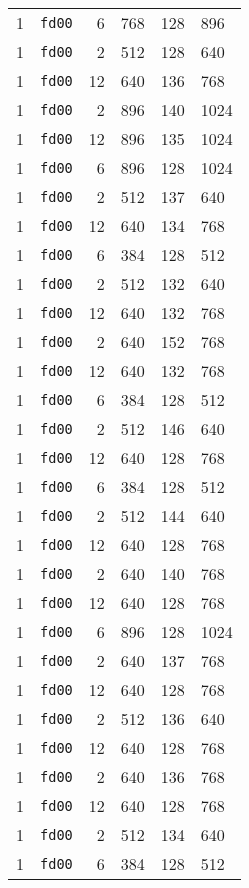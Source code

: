 \documentclass{article}
\begin{document}
\begin{table}[h!]
\begin{tabular}{llrrrl}
    1 & \texttt{fd00} & 6 & 768 & 128 & 896 \\
    1 & \texttt{fd00} & 2 & 512 & 128 & 640 \\
    1 & \texttt{fd00} & 12 & 640 & 136 & 768 \\
    1 & \texttt{fd00} & 2 & 896 & 140 & 1024 \\
    1 & \texttt{fd00} & 12 & 896 & 135 & 1024 \\
    1 & \texttt{fd00} & 6 & 896 & 128 & 1024 \\
    1 & \texttt{fd00} & 2 & 512 & 137 & 640 \\
    1 & \texttt{fd00} & 12 & 640 & 134 & 768 \\
    1 & \texttt{fd00} & 6 & 384 & 128 & 512 \\
    1 & \texttt{fd00} & 2 & 512 & 132 & 640 \\
    1 & \texttt{fd00} & 12 & 640 & 132 & 768 \\
    1 & \texttt{fd00} & 2 & 640 & 152 & 768 \\
    1 & \texttt{fd00} & 12 & 640 & 132 & 768 \\
    1 & \texttt{fd00} & 6 & 384 & 128 & 512 \\
    1 & \texttt{fd00} & 2 & 512 & 146 & 640 \\
    1 & \texttt{fd00} & 12 & 640 & 128 & 768 \\
    1 & \texttt{fd00} & 6 & 384 & 128 & 512 \\
    1 & \texttt{fd00} & 2 & 512 & 144 & 640 \\
    1 & \texttt{fd00} & 12 & 640 & 128 & 768 \\
    1 & \texttt{fd00} & 2 & 640 & 140 & 768 \\
    1 & \texttt{fd00} & 12 & 640 & 128 & 768 \\
    1 & \texttt{fd00} & 6 & 896 & 128 & 1024 \\
    1 & \texttt{fd00} & 2 & 640 & 137 & 768 \\
    1 & \texttt{fd00} & 12 & 640 & 128 & 768 \\
    1 & \texttt{fd00} & 2 & 512 & 136 & 640 \\
    1 & \texttt{fd00} & 12 & 640 & 128 & 768 \\
    1 & \texttt{fd00} & 2 & 640 & 136 & 768 \\
    1 & \texttt{fd00} & 12 & 640 & 128 & 768 \\
    1 & \texttt{fd00} & 2 & 512 & 134 & 640 \\
    1 & \texttt{fd00} & 6 & 384 & 128 & 512 \\

\end{tabular}
\end{table}
\end{document}
